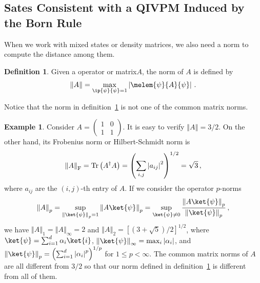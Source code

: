 \documentclass[12pt]{iopart}
\theoremstyle{plain}
\theoremstyle{definition}
\newtheorem{definition}[thm]{Definition}
\newtheorem{example}[thm]{Example}
\theoremstyle{remark}
\newcommand{\nb}{\nolinebreak[3] }
\begin{document}
\subsection{Sates Consistent with a QIVPM Induced by the Born Rule}

When we work with mixed states or density matrices, we also need a
norm to compute the distance among them.

\begin{definition}\label{def:norm}Given a operator or matrix\nb$A$,
the norm of $A$ is defined by\nb\cite{544199}
\begin{equation}
\left\Vert A\right\Vert =\max_{\ip{\psi}{\psi}=1}\left|\melem{\psi}{A}{\psi}\right|\,.
\end{equation}
\end{definition}

Notice that the norm in definition~\ref{def:norm} is not one of
the common matrix norms.

\begin{example}Consider $A=\left(\begin{array}{cc}
1 & 0\\
1 & 1
\end{array}\right)$. It is easy to verify $\left\Vert A\right\Vert =3/2$. On the other
hand, its Frobenius norm or Hilbert-Schmidt norm is\nb\cite{GolubVanLoan1996,Jaeger2007}
\begin{equation}
\left\Vert A\right\Vert _{\mathrm{F}}=\mathop{\mathrm{Tr}}\nolimits\left(A^{\dagger}A\right)=\left(\sum_{i,j}\left|a_{ij}\right|^{2}\right)^{1/2}=\sqrt{3}\,,
\end{equation}
where $a_{ij}$ are the $\left(i,j\right)$-th entry of $A$. If we
consider the operator $p$-norms\nb\cite{RobertsVarberg1973,peres1995quantum,GolubVanLoan1996}
\begin{equation}
\left\Vert A\right\Vert _{p}=\sup_{\left\Vert \ket{\psi}\right\Vert _{p}=1}\left\Vert A\ket{\psi}\right\Vert _{p}=\sup_{\ket{\psi}\ne0}\frac{\left\Vert A\ket{\psi}\right\Vert _{p}}{\left\Vert \ket{\psi}\right\Vert _{p}}\,,
\end{equation}
we have $\left\Vert A\right\Vert _{1}=\left\Vert A\right\Vert _{\infty}=2$
and $\left\Vert A\right\Vert _{2}=\left[\left(3+\sqrt{5}\right)/2\right]^{1/2}$,
where $\ket{\psi}=\sum_{i=1}^{d}\alpha_{i}\ket{i}$, $\left\Vert \ket{\psi}\right\Vert _{\infty}=\max_{i}\left|\alpha_{i}\right|$,
and $\left\Vert \ket{\psi}\right\Vert _{p}=\left(\sum_{i=1}^{d}\left|\alpha_{i}\right|^{p}\right)^{1/p}$
for $1\le p<\infty$. The common matrix norms of $A$ are all different
from $3/2$ so that our norm defined in definition~\ref{def:norm}
is different from all of them.\end{example}
\end{document}
